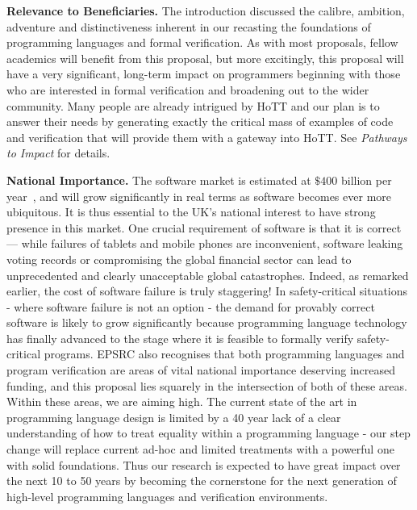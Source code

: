\documentclass[a4paper,11pt]{article}
\begin{document}
\vspace*{-0.1in}


{\bf Relevance to Beneficiaries.} The introduction discussed the
calibre, ambition, adventure and distinctiveness inherent in our
recasting the foundations of programming languages and formal
verification. As with most proposals, fellow academics will benefit
from this proposal, but more excitingly, this proposal will have a
very significant, long-term impact on programmers beginning with those
who are interested in formal verification and broadening out to the
wider community. Many people are
already intrigued by HoTT and our plan is to answer their needs by
generating exactly the critical mass of examples of code and
verification that will provide them with a gateway into HoTT. See {\em
  Pathways to Impact} for details. 
 

{\bf National Importance.} The software market is estimated at
$\$ 400$ billion per year~\cite{gartner}, and will grow significantly in
real terms as software becomes ever more ubiquitous. It is thus
essential to the UK's national interest to have strong presence in
this market. One crucial requirement of software is that it is correct
--- while failures of tablets and mobile phones are inconvenient,
software leaking voting records or compromising the global financial
sector can lead to unprecedented and clearly unacceptable global
catastrophes. Indeed, as remarked earlier, the cost of software
failure is truly staggering! In safety-critical situations - where
software failure is not an option - the demand for provably correct
software is likely to grow significantly because programming
language technology has finally advanced to the stage where it is
feasible to formally verify safety-critical programs.  EPSRC also recognises
that both programming languages and program verification are areas of
vital national importance deserving increased funding, and this
proposal lies squarely in the intersection of both of these
areas. Within these areas, we are aiming high.  The current state of
the art in programming language design is limited by a 40 year lack of
a clear understanding of how to treat equality within a programming
language - our step change will replace current ad-hoc and limited
treatments with a powerful one with solid foundations. Thus our
research is expected to have great impact over the next 10 to 50 years
by becoming the cornerstone for the next generation of high-level
programming languages and verification environments.
\end{document}
